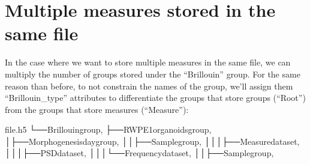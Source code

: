 \documentclass[letterpaper,10pt,english]{sphinxmanual}
\begin{document}
\section{Multiple measures stored in the same file}
\label{\detokenize{source/file_format:multiple-measures-stored-in-the-same-file}}
\sphinxAtStartPar
In the case where we want to store multiple measures in the same file, we can multiply the number of groups stored under the “Brillouin” group.  For the same reason than before, to not constrain the names of the group, we’ll assign them “Brillouin\_type” attributes to differentiate the groups that store groups (“Root”) from the groups that store measures (“Measure”):

\begin{sphinxVerbatim}[commandchars=\\\{\}]
file.h5
└──Brillouingroup,
├──RWPE1organoidsgroup,
│├──Morphogenesisdaygroup,
││├──Samplegroup,
│││├──Measuredataset,
│││├──PSDdataset,
│││└──Frequencydataset,
││├──Samplegroup,

\end{sphinxVerbatim}
\end{document}
